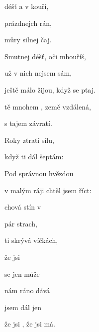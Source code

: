 

\zs
{} déšť a  v kouři,

 prázdnejch rán, 

 můry  silnej čaj. 
\ks

\zs
Smutnej déšť, oči mhouříš,

už v nich nejsem sám,

ještě málo žijou, když se ptaj.
\ks

\zr
{} tě mnohem , země vzdálená,  

 s tajem závratí. 
\kr

\zs
Roky ztratí sílu,

když ti dál šeptám:

\ks

\zs
Pod správnou hvězdou

v malým ráji chtěl jsem říct:

\ks

\zs
{} chová stín v 

 pár  strach,

 ti skrývá  víčkách,

že jsi 
\ks

\zs
{} se jen může 

 nám ráno dává 

 jsem dál jen 

že jsi , že jsi má. 
\ks

\zr
\kr

\kp






















